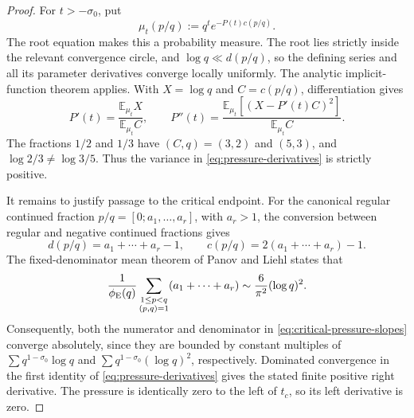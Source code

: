 \begin{proof}
For \(t>-\sigma_0\), put
\[
 \mu_t(p/q):=q^t e^{-P(t)c(p/q)}.
\]
The root equation makes this a probability measure.  The root lies strictly
inside the relevant convergence circle, and
\(\log q\ll d(p/q)\), so the defining series and all its parameter
derivatives converge locally uniformly.  The analytic implicit-function
theorem applies.  With \(X=\log q\) and \(C=c(p/q)\), differentiation gives
\begin{equation}
 P'(t)=\frac{\mathbb E_{\mu_t}X}{\mathbb E_{\mu_t}C},
 \qquad
 P''(t)=
 \frac{\mathbb E_{\mu_t}[(X-P'(t)C)^2]}
      {\mathbb E_{\mu_t}C}.
 \label{eq:pressure-derivatives}
\end{equation}
The fractions \(1/2\) and \(1/3\) have \((C,q)=(3,2)\) and \((5,3)\),
and \(\log2/3\ne\log3/5\).  Thus the variance in
\eqref{eq:pressure-derivatives} is strictly positive.

It remains to justify passage to the critical endpoint.  For the canonical
regular continued fraction \(p/q=[0;a_1,\ldots,a_r]\), with \(a_r>1\),
the conversion between regular and negative continued fractions gives
\[
 d(p/q)=a_1+\cdots+a_r-1,
 \qquad c(p/q)=2(a_1+\cdots+a_r)-1.
\]
The fixed-denominator mean theorem of Panov and Liehl
\cite{Panov1982,Liehl1983,AistleitnerBordaHauke2023} states that
\[
 \frac1{\phi_{\rm E}(q)}
 \sum_{\substack{1\le p<q\\(p,q)=1}}(a_1+\cdots+a_r)
 \sim\frac6{\pi^2}(\log q)^2.
\]
Consequently, both the numerator and denominator in
\eqref{eq:critical-pressure-slopes} converge absolutely, since they are
bounded by constant multiples of
\(\sum q^{1-\sigma_0}\log q\) and
\(\sum q^{1-\sigma_0}(\log q)^2\), respectively.  Dominated convergence in
the first identity of \eqref{eq:pressure-derivatives} gives the stated finite
positive right derivative.  The pressure is identically zero to the left of
\(t_c\), so its left derivative is zero.
\end{proof}
\fi
